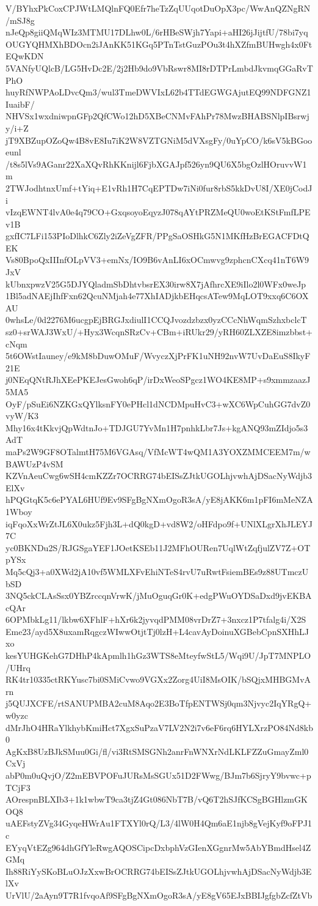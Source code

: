 V/BYhxPkCoxCPJWtLMQlnFQ0Efr7heTzZqUUqotDuOpX3pc/WwAnQZNgRN/mSJ8g
nJeQp8giiQMqWIz3MTMU17DLhw0L/6rHBeSWjh7Yapi+aHI26jJijtfU/78bi7yq
OUGYQHMXhBDOcn2iJAnKK51KGq5PTnTstGuzPOu3t4hXZfmBUHwgh4x0FtEQwKDN
5VANfyUQlcB/LG5HvDc2E/2j2Hb9do9VbRswr8MI8rDTPrLmbdJkvmqGGaRvTPhO
huyRfNWPAoLDvcQm3/wul3TmeDWVIxL62b4TTdEGWGAjutEQ99NDFGNZ1IuaibF/
NHVSx1wxdniwpnGFp2QfCWo12hD5XBeCNMvFAhPr78MwzBHABSNlpIBsrwjy/i+Z
jT9XBZupOZoQw4B8vE8Iu7iK2W8VZTGNiM5dVXsgFy/0uYpCO/k6sV5kBGooeunl
/t8s5lVs9AGanr22XaXQvRhKKnijl6FjbXGAJpf526yn9QU6X5bgOzlHOruvvW1m
2TWJodhtnxUmf+tYiq+E1vRh1H7CqEPTDw7iNi0fur8rbS5kkDvU8I/XE0jCodJi
vIzqEWNT4lvA0e4q79CO+GxqsoyoEqyzJ078qAYtPRZMeQU0woEtKStFmfLPEv1B
gxfIC7LFi153PIoDlhkC6Zly2iZeVgZFR/PPgSaOSHkG5N1MKfHzBrEGACFDtQEK
Vs80BpoQxIIInfOLpVV3+emNx/IO9B6vAnLI6xOCmwvg9zphcnCXcq41nT6W9JxV
kUbnxpwzV25G5DJYQladmSbDhtvbsrEX30irw8X7jAfhrcXE9iIlo2l0WFx0weJp
1Bl5adNAEjIhfFxn62QcuNMjah4e77XhIADjkbEHqcsATew9MqLOT9xxq6C6OXAU
0whsLe/0d2276M6ucgpEjBRGJxdiulI1CCQJvozdzbzx0yzCCcNhWqmSzhxbclcT
sz0+srWAJ3WxU/+Hyx3WcqnSRzCv+CBm+iRUkr29/yRH60ZLXZE8imzbbst+cNqm
5t6OWstIauney/e9kM8bDuwOMuF/WvyczXjPrFK1uNH92nvW7UvDaEuS8IkyF21E
j0NEqQNtRJhXEePKEJesGwoh6qP/irDxWeoSPgcz1WO4KE8MP+s9xmmzaazJ5MA5
OyF/pSuEi6NZKGxQYlksnFY0ePHcl1dNCDMpuHvC3+wXC6WpCuhGG7dvZ0vyW/K3
Mhy16x4tKkvjQpWdtnJo+TDJGU7YvMn1H7pnhkLbr7Js+kgANQ93mZIdjo5s3AdT
maPs2W9GF8OTalmtH75M6VGAsq/VfMcWT4wQM1A3YOXZMMCEEM7m/wBAWUzP4vSM
KZVnAeuCwg6wSH4cmKZZr7OCRRG74bEISsZJtkUGOLhjvwhAjDSacNyWdjb3ElXv
hPQGtqK5c6ePYAL6HUf9Ev9SFgBgNXmOgoR3sA/yE8jAKK6m1pFI6mMeNZA1Wboy
iqFqoXxWrZtJL6X0ukz5Fjh3L+dQ0kgD+vd8W2/oHFdpo9f+UNlXLgrXhJLEYJ7C
yc0BKNDu2S/RJGSgaYEF1JOetKSEb11J2MFhOURen7UqlWtZqfjulZV7Z+OTpYSx
Mq5cQj3+a0XWd2jA10vf5WMLXFvEhiNTeS4rvU7uRwtFsiemBEs9z88UTmczUbSD
3NQ5ckCLAsSsx0YBZrccqnVrwK/jMuOguqGr0K+edgPWuOYDSaDxd9jvEKBAcQAr
6OPMbkLg11/lkbw6XFhlF+hXr6k2jyvqdPMM08vrDrZ7+3nxcz1P7tfalg4i/X2S
Eme23/ayd5X8uxamRqgczWIwwOtjtTj0lzH+L4cavAyDoinuXGBebCpnSXHhLJxo
kesYUHGKehG7DHhP4kApmlh1hGz3WTS8eMteyfwStL5/Wqi9U/JpT7MNPLO/UHrq
RK4tr10335ctRKYusc7bi0SMiCvwo9VGXx2Zorg4UiI8MsOIK/bSQjxMHBGMvArn
j5QUJXCFE/rtSANUPMBA2cuM8Aqo2E3BoTfpENTWSj0qm3Njvyc2IqYRgQ+w0yzc
dMrJhO4HRaYlkhybKmiHct7XgxSuPzaV7LV2N2i7v6eF6rq6HYLXrzPO84Nd8kb0
AgKxB8UzBJkSMuu0Gi/fl/vi3RtSMSGNh2anrFnWNXrNdLKLFZZuGmayZml0CxVj
abP0m0uQvjO/Z2mEBVPOFuJURsMsSGUx51D2FWwg/BJm7b6SjryY9bvwc+pTCjF3
AOrespnBLXIb3+1k1wbwT9ca3tjZ4Gt086NbT7B/vQ6T2hSJfKCSgBGHlzmGKOQ8
uAEFstyZVg34GyqeHWrAu1FTXYl0rQ/L3/4lW0H4Qm6aE1njb8gVejKyf9oFPJ1c
EYyqVtEZg964dhGfYleRwgAQOSCipcDxbphVzGIenXGgnrMw5AbYBmdHsel4ZGMq
Ih88RiYySKoBLuOJzXxwBrOCRRG74bEISsZJtkUGOLhjvwhAjDSacNyWdjb3ElXv
UrVlU/2aAyn9T7R1fvqoAf9SFgBgNXmOgoR3sA/yE8gV65EJxBBIJgfgbZcfZtVb
